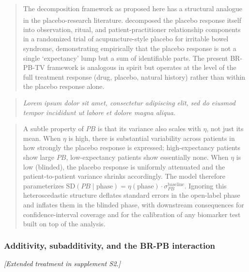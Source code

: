 \documentclass[
  11pt,
]{article}
\newcounter{none} %
\newenvironment{rgt}{%
  \begin{quote}\small\itshape\color[RGB]{20,60,160}}{%
  \end{quote}}
\newenvironment{orig}{%
  \begin{quote}\normalsize\color[gray]{0.55}}{%
  \end{quote}}
\begin{document}
\begin{orig}
The decomposition framework as proposed here has a structural
analogue in the placebo-research literature.\textsuperscript{}
decomposed the placebo response itself into observation, ritual,
and patient-practitioner relationship components in a randomized
trial of acupuncture-style placebo for irritable bowel syndrome,
demonstrating empirically that the placebo response is not a
single `expectancy' lump but a sum of identifiable parts. The
present BR-PB-TV framework is analogous in spirit but operates
at the level of the full treatment response (drug, placebo,
natural history) rather than within the placebo response alone.

\end{orig}

\begin{rgt}
Lorem ipsum dolor sit amet, consectetur adipiscing elit, sed do eiusmod tempor incididunt ut labore et dolore magna aliqua.

\end{rgt}

\begin{orig}
A subtle property of \(PB\) is that its variance also scales with
\(\eta\), not just its mean. When \(\eta\) is high, there is
substantial variability across patients in how strongly the
placebo response is expressed; high-expectancy patients show
large \(PB\), low-expectancy patients show essentially none.
When \(\eta\) is low (blinded), the placebo response is uniformly
attenuated and the patient-to-patient variance shrinks
accordingly. The model therefore parameterizes
\(\mathrm{SD}(PB \mid \text{phase}) = \eta(\text{phase}) \cdot
\sigma_{PB}^{\text{baseline}}\). Ignoring this heteroscedastic
structure deflates standard errors in the open-label phase and
inflates them in the blinded phase, with downstream consequences
for confidence-interval coverage and for the calibration of any
biomarker test built on top of the analysis.

\end{orig}

\subsubsection{Additivity, subadditivity, and the BR-PB interaction}\label{additivity-subadditivity-and-the-br-pb-interaction}

\emph{{[}Extended treatment in supplement S2.{]}}
\end{document}
